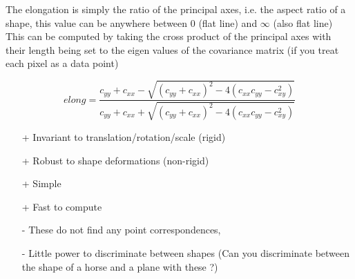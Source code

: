 \documentclass{article}
\begin{document}
{    

    The elongation is simply the ratio of the principal axes, i.e. the aspect ratio of a shape, this value can be anywhere between 0 (flat line) and $\infty$ (also flat line)
    This can be computed by taking the cross product of the principal axes with their length being set to the eigen values of the covariance matrix (if you treat each pixel as a data point)
    \begin{center}
    \end{center}
    \begin{equation}
        \textit{elong} = \frac{c_{yy} + c_{xx} - \sqrt{(c_{yy}+c_{xx})^{2} -4(c_{xx}c_{yy} - c_{xy}^{2})}}
                                {c_{yy} + c_{xx} + \sqrt{(c_{yy}+c_{xx})^{2} -4(c_{xx}c_{yy} - c_{xy}^{2})}}
    \end{equation}


    \begin{itemize}[noitemsep]
        \item[+] Invariant to translation/rotation/scale (rigid)
        \item[+] Robust to shape deformations (non-rigid)
        \item[+] Simple 
        \item[+] Fast to compute  
        \item[-] These do not find any point correspondences, 
        \item[-] Little power to discriminate between shapes (Can you discriminate between the shape of a horse and a plane with these ?) 
    \end{itemize}
}
\end{document}
